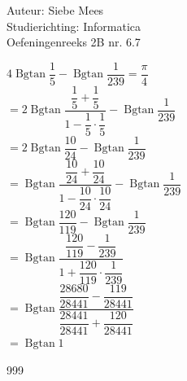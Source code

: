 \documentclass[a4paper]{article}
\newcommand{\Bgtan}{\operatorname{Bgtan}}
\begin{document}
  
\noindent \large Auteur: Siebe Mees \\
\noindent \large Studierichting: Informatica\\
\noindent \large Oefeningenreeks 2B nr. 6.7\\

\medskip

\normalsize


$4\Bgtan\dfrac{1}{5} - \Bgtan\dfrac{1}{239} = \dfrac{\pi}{4}$\\

$= 2\Bgtan\dfrac{\dfrac{1}{5}+\dfrac{1}{5}}{1-\dfrac{1}{5}\cdot\dfrac{1}{5}} - \Bgtan\dfrac{1}{239}$\\

$= 2\Bgtan\dfrac{10}{24} - \Bgtan\dfrac{1}{239}$\\

$= \Bgtan\dfrac{\dfrac{10}{24}+\dfrac{10}{24}}{1-\dfrac{10}{24}\cdot\dfrac{10}{24}} - \Bgtan\dfrac{1}{239}$\\

$= \Bgtan\dfrac{120}{119} - \Bgtan\dfrac{1}{239}$\\

$= \Bgtan\dfrac{\dfrac{120}{119}-\dfrac{1}{239}}{1+\dfrac{120}{119}\cdot\dfrac{1}{239}} $\\

$= \Bgtan\dfrac{\dfrac{28680}{28441}-\dfrac{119}{28441}}{\dfrac{28441}{28441}+\dfrac{120}{28441}} $\\

$= \Bgtan1$\\

\begin{thebibliography}{999}

\end{thebibliography}
\end{document}
